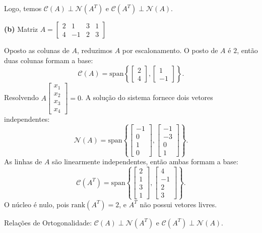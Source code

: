 \begin{resolution}
  Logo, temos \( \mathcal{C}(A) \perp \mathcal{N}(A^T) \) e \( \mathcal{C}(A^T) \perp \mathcal{N}(A) \).

  \vspace{24pt}
  {\bf (b)} Matriz \( A = \begin{bmatrix} 2 & 1 & 3 & 1 \\ 4 & -1 & 2 & 3 \end{bmatrix} \)

  Oposto as colunas de \( A \), reduzimos \( A \) por escalonamento. O posto de \( A \) é \( 2 \), então duas colunas formam a base:
  \[
    \mathcal{C}(A) = \text{span}\left\{ \begin{bmatrix} 2 \\ 4 \end{bmatrix}, \begin{bmatrix} 1 \\ -1 \end{bmatrix} \right\}.
  \]
  Resolvendo \( A \begin{bmatrix} x_1 \\ x_2 \\ x_3 \\ x_4 \end{bmatrix} = 0 \). A solução do sistema fornece dois vetores independentes:
  \[
    \mathcal{N}(A) = \text{span}\left\{ \begin{bmatrix} -1 \\ 0 \\ 1 \\ 0 \end{bmatrix}, \begin{bmatrix} -1 \\ -3 \\ 0 \\ 1 \end{bmatrix} \right\}.
  \]
  As linhas de \( A \) são linearmente independentes, então ambas formam a base:
  \[
    \mathcal{C}(A^T) = \text{span}\left\{ \begin{bmatrix} 2 \\ 1 \\ 3 \\ 1 \end{bmatrix}, \begin{bmatrix} 4 \\ -1 \\ 2 \\ 3 \end{bmatrix} \right\}.
  \]
  O núcleo é nulo, pois \( \text{rank}(A^T) = 2 \), e \( A^T \) não possui vetores livres.

  Relações de Ortogonalidade: \( \mathcal{C}(A) \perp \mathcal{N}(A^T) \) e \( \mathcal{C}(A^T) \perp \mathcal{N}(A) \).

\end{resolution}

